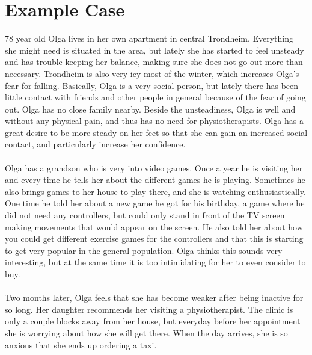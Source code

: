 \section{Example Case}
78 year old Olga lives in her own apartment in central Trondheim. Everything she might need is situated in the area, but lately she has started  to feel unsteady and has trouble keeping her balance, making sure she does not go out more than necessary. Trondheim is also very icy most of the winter, which increases Olga's fear for falling. Basically, Olga is a very social person, but lately there has been little contact with friends and other people in general because of the fear of going out. Olga has no close family nearby. Beside the unsteadiness, Olga is well and without any physical pain, and thus has no need for physiotherapists. Olga has a great desire to be more steady on her feet so that she can gain an increased social contact, and particularly increase her confidence. \\ \\
Olga has a grandson who is very into video games. Once a year he is visiting her and every time he tells her about the different games he is playing. Sometimes he also brings games to her house to play there, and she is watching enthusiastically. One time he told her about a new game he got for his birthday, a game where he did not need any controllers, but could only stand in front of the TV screen making movements that would appear on the screen. He also told her about how you could get different exercise games for the controllers and that this is starting to get very popular in the general population. Olga thinks this sounds very interesting, but at the same time it is too intimidating for her to even consider to buy.   \\ \\
Two months later, Olga feels that she has become weaker after being inactive for so long. Her daughter recommends her visiting a physiotherapist. The clinic is only a couple blocks away from her house, but everyday before her appointment she is worrying about how she will get there. When the day arrives, she is so anxious that she ends up ordering a taxi. \\ \\
